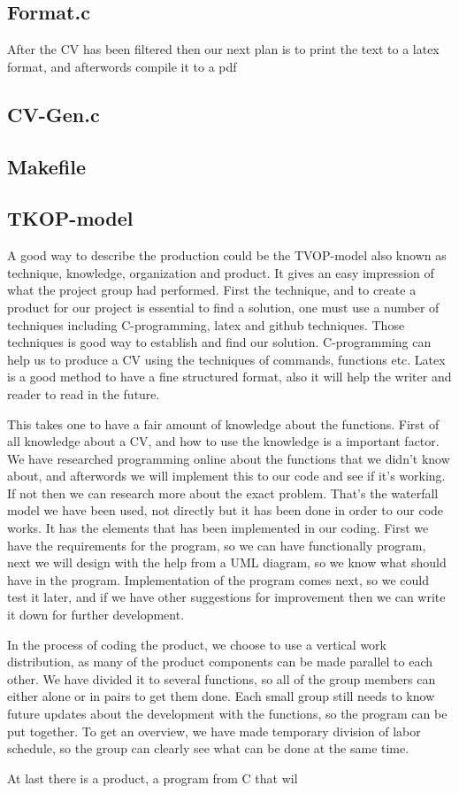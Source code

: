 \subsection{Format.c}
After the CV has been filtered then our next plan is to print the text to a latex format, and afterwords compile it to a pdf 

\subsection{CV-Gen.c}
\subsection{Makefile}

\subsection{TKOP-model}
A good way to describe the production could be the TVOP-model also known as technique, knowledge, organization and product.
It gives an easy impression of what the project group had performed.
First the technique, and to create a product for our project is essential to find a solution, 
one must use a number of techniques including C-programming, latex and github techniques.
Those techniques is good way to establish and find our solution. C-programming can help us to produce a CV using the techniques
of commands, functions etc. Latex is a good method to have a fine structured format, 
also it will help the writer and reader to read in the future. \newline

This takes one to have a fair amount of knowledge about the functions.
First of all knowledge about a CV, and how to use the knowledge is a important factor.
We have researched programming online about the functions that we didn't know about, 
and afterwords we will implement this to our code and see if it's working. If not then we can research more about the exact problem.
That's the waterfall model we have been used, not directly but it has been done in order to our code works.
It has the elements that has been implemented in our coding. First we have the requirements for the program, 
so we can have functionally program, next we will design with the help from a UML diagram, 
so we know what should have in the program. Implementation of the program comes next, so we could test it later, 
and if we have other suggestions for improvement then we can write it down for further development.

In the process of coding the product, we choose to use a vertical work distribution, as many of the product
components can be made parallel to each other. We have divided it to several functions, 
so all of the group members can either alone or in pairs to get them done.
Each small group still needs to know future updates about the development with the functions, so the program can be put together.
To get an overview, we have made temporary division of labor
schedule, so the group can clearly see what can be done at the same time.

At last there is a product, a program from C that wil 
